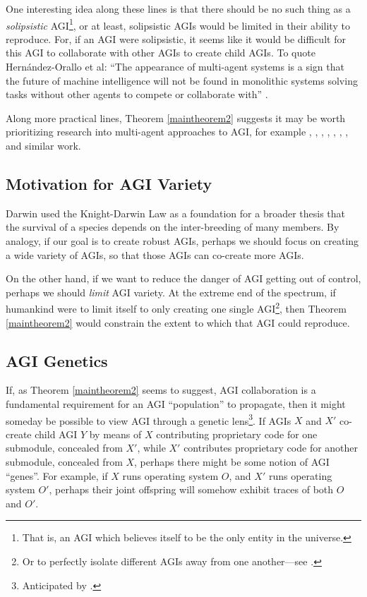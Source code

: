 \documentclass[runningheads]{llncs}
\begin{document}
One interesting idea along these lines is that there should be no
such thing as a \emph{solipsistic} AGI\footnote{That is, an AGI which believes itself
to be the only entity in the universe.}, or at least, solipsistic AGIs would be
limited in their ability to reproduce.
For, if an AGI were solipsistic, it
seems like it would be difficult for this AGI to collaborate with other AGIs
to create child AGIs.
To quote Hern{\'a}ndez-Orallo et al: ``The appearance of multi-agent systems is a sign that
the future of machine intelligence will not be found in monolithic systems
solving tasks without other agents to compete or collaborate with''
\cite{hernandez2011more}.

Along more practical lines, Theorem \ref{maintheorem2} suggests it may be worth
prioritizing research into multi-agent approaches to AGI, for example
\cite{castelfranchi1998modelling}, \cite{hernandez2011more},
\cite{hibbard2011societies}, \cite{lazaridou2018emergence},
\cite{thorisson2004constructionist}, \cite{potyka2016group},
\cite{kolonin2018reputation},
and similar work.

\subsection{Motivation for AGI Variety}

Darwin used the Knight-Darwin Law as a foundation for
a broader thesis that the survival of a
species depends on the inter-breeding of many members.
By analogy, if our goal is to create robust AGIs, perhaps
we should focus on creating a wide variety of AGIs, so that
those AGIs can co-create more AGIs.

On the other hand, if we want to reduce the danger of AGI getting out of control,
perhaps we should \emph{limit} AGI variety. At the extreme end
of the spectrum, if humankind were to limit itself to only creating one single
AGI\footnote{Or to perfectly isolate
different AGIs away from
one another---see \cite{yampolskiy2012leakproofing}.}, then
Theorem \ref{maintheorem2} would constrain the extent to which
that AGI could reproduce.


\subsection{AGI Genetics}

If, as Theorem \ref{maintheorem2} seems to suggest, AGI collaboration
is a fundamental requirement for an AGI ``population'' to propagate, then it might
someday be possible to view AGI through a genetic lens\footnote{Anticipated
by \cite{buchanan1988artificial}.}. If AGIs $X$ and $X'$ co-create child AGI $Y$ by
means of $X$ contributing proprietary code for one submodule, concealed from $X'$,
while $X'$ contributes proprietary code for another submodule, concealed from $X$,
perhaps there might be some notion of AGI ``genes''. For example, if $X$ runs operating
system $O$, and $X'$ runs operating system $O'$, perhaps their joint offspring
will somehow exhibit traces of both $O$ and $O'$.
\end{document}
